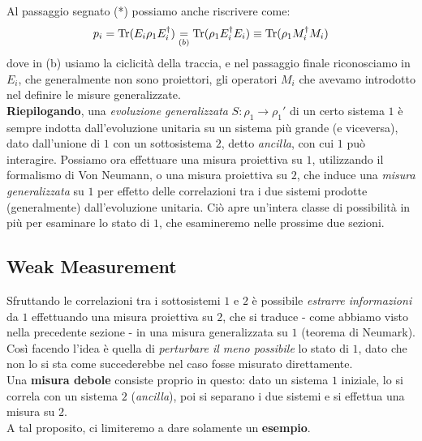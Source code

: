 \documentclass[../../InformazioneQuantistica.tex]{subfiles}
\begin{document}
Al passaggio segnato (*) possiamo anche riscrivere come:
\begin{align*}
p_i = \operatorname{Tr}(E_i \rho_1 E_i^\dag) \underset{(b)}{=} \operatorname{Tr}(\rho_1 E_i^\dag E_i) \equiv \operatorname{Tr}(\rho_1 M_i^\dag M_i)      
\end{align*}
dove in (b) usiamo la ciclicità della traccia, e nel passaggio finale riconosciamo in $E_i$, che generalmente non sono proiettori, gli operatori $M_i$ che avevamo introdotto nel definire le misure generalizzate.\\

\textbf{Riepilogando}, una \textit{evoluzione generalizzata} $S: \rho_1 \to \rho_1'$ di un certo sistema $1$ è sempre indotta dall'evoluzione unitaria su un sistema più grande (e viceversa), dato dall'unione di $1$ con un sottosistema $2$, detto \textit{ancilla}, con cui $1$ può interagire. Possiamo ora effettuare una misura proiettiva su $1$, utilizzando il formalismo di Von Neumann, o una misura proiettiva su $2$, che induce una \textit{misura generalizzata} su $1$ per effetto delle correlazioni tra i due sistemi prodotte (generalmente) dall'evoluzione unitaria. Ciò apre un'intera classe di possibilità in più per esaminare lo stato di $1$, che esamineremo nelle prossime due sezioni.

\subsection{Weak Measurement}
Sfruttando le correlazioni tra i sottosistemi $1$ e $2$ è possibile \textit{estrarre informazioni} da $1$ effettuando una misura proiettiva su $2$, che si traduce - come abbiamo visto nella precedente sezione - in una misura generalizzata su $1$ (teorema di Neumark). Così facendo l'idea è quella di \textit{perturbare il meno possibile} lo stato di $1$, dato che non lo si sta  come succederebbe nel caso fosse misurato direttamente.\\
Una \textbf{misura debole} consiste proprio in questo: dato un sistema $1$ iniziale, lo si correla con un sistema $2$ (\textit{ancilla}), poi si separano i due sistemi e si effettua una misura su $2$.\\
A tal proposito, ci limiteremo a dare solamente un \textbf{esempio}. \\
\end{document}
